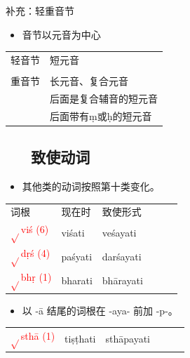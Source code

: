 \documentclass[17pt]{beamer}
\newcommand{\verbroot}[1]{\textcolor{red}{$\sqrt{}$#1}}
\newcommand{\fullpada}[1]{\textcolor{OliveGreen}{#1}}
\begin{document}
\begin{frame}{补充：轻重音节}
  \centering
  \begin{itemize}
    \item 音节以元音为中心
  \end{itemize}
  \bigskip
  \begin{NiceTabular}{@{}ll@{}} %
    轻音节 &  短元音 \\
    \\
    重音节 & 长元音、复合元音  \\
     & 后面是复合辅音的短元音 \\
     & 后面带有ṃ或ḥ的短元音 \\
  \end{NiceTabular}
\end{frame}

\subsection{~~~致使动词}
\begin{frame}{\insertsubsection}
  \begin{itemize}
    \item
      其他类的动词按照第十类变化。    
  \end{itemize}
  \centering
  \begin{tabular}{@{}llllll@{}} %
      词根 & 现在时 & 致使形式  \\
      \verbroot{viś (6)} & \fullpada{viśati} & \fullpada{veśayati} \\
      \verbroot{dṛś (4)} & \fullpada{paśyati} & \fullpada{darśayati} \\
      \verbroot{bhṛ (1)} & \fullpada{bharati} & \fullpada{bhārayati} \\
    \end{tabular}
  \begin{itemize}
    \item
      以 \nobreakdash-ā 结尾的词根在 \nobreakdash-aya\nobreakdash- 前加 \nobreakdash-p\nobreakdash-。  
  \end{itemize}
  \begin{tabular}{@{}llllll@{}} %

      \verbroot{sthā (1)} & \fullpada{tiṣṭhati} & \fullpada{sthāpayati} \\
    \end{tabular}
\end{frame}
\end{document}

